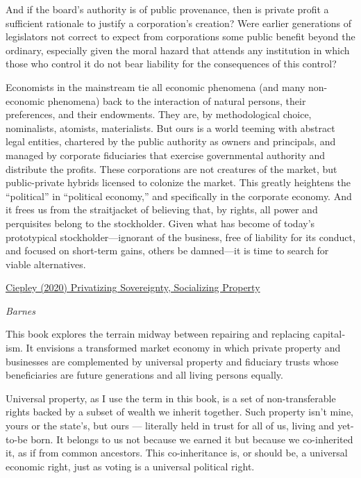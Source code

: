 \documentclass[
]{book}
\begin{document}
And if the board's authority is of public provenance, then is private profit a sufficient rationale to justify a corporation's creation? Were earlier generations of legislators not correct to expect from corporations some public benefit beyond the ordinary, especially given the moral hazard that attends any institution in which those who control it do not bear liability for the consequences of this control?

Economists in the mainstream tie all economic phenomena (and many non-economic phenomena) back to the interaction of natural persons, their preferences, and their endowments. They are, by methodological choice, nominalists, atomists, materialists. But ours is a world teeming with abstract legal entities, chartered by the public authority as owners and principals, and managed by corporate fiduciaries that exercise governmental authority and distribute the profits. These corporations are not creatures of the market, but public-private hybrids licensed to colonize the market. This greatly heightens the ``political'' in ``political economy,'' and specifically in the corporate economy. And it frees us from the straitjacket of believing that, by rights, all power and perquisites belong to the stockholder. Given what has become of today's prototypical stockholder---ignorant of the business, free of liability for its conduct, and focused on short-term gains, others be damned---it is time to search for viable alternatives.

\href{https://lpeproject.org/blog/privatizing-sovereignty-socializing-property-what-economics-doesnt-teach-you-about-the-corporation/}{Ciepley (2020) Privatizing Sovereignty, Socializing Property}

\emph{Barnes}

This book explores the terrain midway between repairing and re­pla­cing capi­tal­ism. It envisions a transformed market economy in which private pro­perty and busi­nesses are complemented by universal pro­perty and fiduciary trusts whose beneficiaries are future generations and all living persons equally.

Universal property, as I use the term in this book, is a set of non-transferable rights backed by a subset of wealth we inherit toge­ther. Such property isn't mine, yours or the state's, but ours --- literally held in trust for all of us, living and yet-to-be born. It belongs to us not because we earned it but because we co-inherited it, as if from common ances­tors. This co-inheritance is, or should be, a uni­­versal econ­omic right, just as voting is a universal political right.
\end{document}

